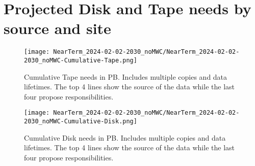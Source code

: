 \section{Projected Disk and Tape needs by source and site}
\begin{figure}[h]
\centering\texttt{[image: NearTerm\_2024-02-02-2030\_noMWC/NearTerm\_2024-02-02-2030\_noMWC-Cumulative-Tape.png]}
\caption{Cumulative Tape needs in PB. Includes multiple copies and data lifetimes. The top 4 lines show the source of the data while the last four propose responsibilities.}
\label{fig:Cumulative-Tape}
\end{figure}
\begin{figure}[h]
\centering\texttt{[image: NearTerm\_2024-02-02-2030\_noMWC/NearTerm\_2024-02-02-2030\_noMWC-Cumulative-Disk.png]}
\caption{Cumulative Disk needs in PB. Includes multiple copies and data lifetimes. The top 4 lines show the source of the data while the last four propose responsibilities.}
\label{fig:Cumulative-Disk}
\end{figure}
